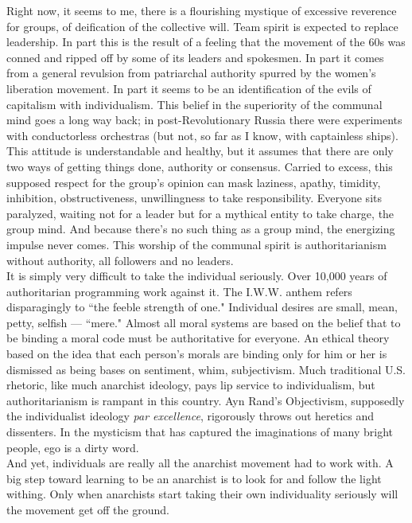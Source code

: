 Right now, it seems to me, there is a flourishing mystique of excessive reverence for groups, of deification of the collective will. Team spirit is expected to replace leadership. In part this is the result of a feeling that the movement of the 60s was conned and ripped off by some of its leaders and spokesmen. In part it comes from a general revulsion from patriarchal authority spurred by the women's liberation movement. In part it seems to be an identification of the evils of capitalism with individualism. This belief in the superiority of the communal mind goes a long way back; in post-Revolutionary Russia there were experiments with conductorless orchestras (but not, so far as I know, with captainless ships). This attitude is understandable and healthy, but it assumes that there are only two ways of getting things done, authority or consensus. Carried to excess, this supposed respect for the group's opinion can mask laziness, apathy, timidity, inhibition, obstructiveness, unwillingness to take responsibility. Everyone sits paralyzed, waiting not for a leader but for a mythical entity to take charge, the group mind. And because there's no such thing as a group mind, the energizing impulse never comes. This worship of the communal spirit is authoritarianism without authority, all followers and no leaders.\\
It is simply very difficult to take the individual seriously. Over 10,000 years of authoritarian programming work against it. The I.W.W. anthem refers disparagingly to ``the feeble strength of one." Individual desires are small, mean, petty, selfish --- ``mere." Almost all moral systems are based on the belief that to be binding a moral code must be authoritative for everyone. An ethical theory based on the idea that each person's morals are binding only for him or her is dismissed as being bases on sentiment, whim, subjectivism. Much traditional U.S. rhetoric, like much anarchist ideology, pays lip service to individualism, but authoritarianism is rampant in this country. Ayn Rand's Objectivism, supposedly the individualist ideology \emph{par excellence}, rigorously throws out heretics and dissenters. In the mysticism that has captured the imaginations of many bright people, ego is a dirty word.\\
And yet, individuals are really all the anarchist movement had to work with. A big step toward learning to be an anarchist is to look for and follow the light withing. Only when anarchists start taking their own individuality seriously will the movement get off the ground.\\
